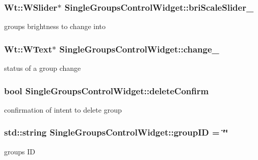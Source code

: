 \subsubsection[{\texorpdfstring{bri\+Scale\+Slider\+\_\+}{briScaleSlider_}}]{\setlength{\rightskip}{0pt plus 5cm}Wt\+::\+W\+Slider$\ast$ Single\+Groups\+Control\+Widget\+::bri\+Scale\+Slider\+\_\+\hspace{0.3cm}{\ttfamily [private]}}\hypertarget{classSingleGroupsControlWidget_a761ff567fbcdc336c2b13ca9b9202478}{}\label{classSingleGroupsControlWidget_a761ff567fbcdc336c2b13ca9b9202478}
group\textquotesingle{}s brightness to change into 
\subsubsection[{\texorpdfstring{change\+\_\+}{change_}}]{\setlength{\rightskip}{0pt plus 5cm}Wt\+::\+W\+Text$\ast$ Single\+Groups\+Control\+Widget\+::change\+\_\+\hspace{0.3cm}{\ttfamily [private]}}\hypertarget{classSingleGroupsControlWidget_a02fc84979ad2e0424a78ea3961c06a7d}{}\label{classSingleGroupsControlWidget_a02fc84979ad2e0424a78ea3961c06a7d}
status of a group change 
\subsubsection[{\texorpdfstring{delete\+Confirm}{deleteConfirm}}]{\setlength{\rightskip}{0pt plus 5cm}bool Single\+Groups\+Control\+Widget\+::delete\+Confirm\hspace{0.3cm}{\ttfamily [private]}}\hypertarget{classSingleGroupsControlWidget_ab428d0f6a6c39724b434fc80e39c6b18}{}\label{classSingleGroupsControlWidget_ab428d0f6a6c39724b434fc80e39c6b18}
confirmation of intent to delete group 
\subsubsection[{\texorpdfstring{group\+ID}{groupID}}]{\setlength{\rightskip}{0pt plus 5cm}std\+::string Single\+Groups\+Control\+Widget\+::group\+ID = \char`\"{}\char`\"{}\hspace{0.3cm}{\ttfamily [private]}}\hypertarget{classSingleGroupsControlWidget_ace03ddb209483e37c7f760fdb73baba7}{}\label{classSingleGroupsControlWidget_ace03ddb209483e37c7f760fdb73baba7}
group\textquotesingle{}s ID 
